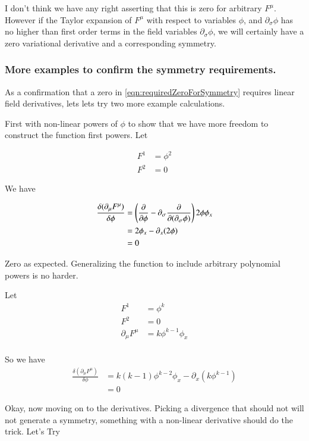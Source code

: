 \documentclass{article}
\begin{document}
I don't think we have any right asserting that this is zero for arbitrary $F^\mu$.  However
if the Taylor expansion of $F^\mu$ with respect to variables $\phi$, and $\partial_\sigma \phi$ has
no higher than first order terms in the field variables $\partial_\sigma \phi$, we will
certainly have a zero variational derivative and a corresponding symmetry.

\subsubsection{ More examples to confirm the symmetry requirements. }

As a confirmation that a zero in \ref{eqn:requiredZeroForSymmetry} requires linear field derivatives, 
lets lets try two more example calculations.  

First with non-linear
powers of $\phi$ to show that we have more freedom to construct the function first powers.  Let

\begin{align*}
F^1 &= \phi^2 \\
F^2 &= 0
\end{align*}

We have

\begin{align*}
\frac{\delta (\partial_\mu F^\mu)}{\delta \phi} 
&=
\left(\frac{\partial {}}{\partial {\phi}} - \partial_\sigma \frac{\partial {}}{\partial {(\partial_\sigma \phi)}}\right) 2 \phi \phi_x \\
&=
2 \phi_x - \partial_x (2 \phi) \\
&= 0
\end{align*}

Zero as expected.  Generalizing the function to include arbitrary polynomial powers is no harder.

Let
\begin{align*}
F^1 &= \phi^k \\
F^2 &= 0 \\
\partial_\mu F^\mu &= k \phi^{k-1} \phi_x \\
\end{align*}

So we have
\begin{align*}
\frac{\delta (\partial_\mu F^\mu)}{\delta \phi}  
&= 
k (k-1) \phi^{k-2} \phi_x - \partial_x (k \phi^{k-1})  \\
&= 0
\end{align*}

Okay, now moving on to the derivatives.  Picking a divergence that should not will not generate a
symmetry, something with a non-linear derivative should do the trick.  Let's Try
\end{document}
